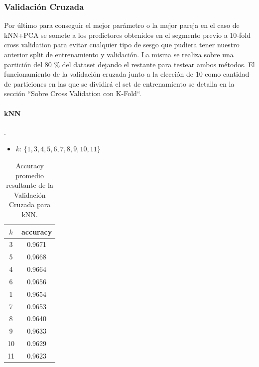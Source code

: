 \subsubsection{Validación Cruzada}

Por último para conseguir el mejor parámetro o la mejor pareja en el caso de kNN+PCA se somete a los predictores obtenidos en el segmento previo a 10-fold cross
validation para evitar cualquier tipo de sesgo que pudiera tener nuestro anterior split de entrenamiento y validación. La misma se realiza sobre una partición del 80 $\%$ del dataset dejando el restante para testear ambos métodos.
El funcionamiento de la validación cruzada junto a la elección de 10 como cantidad de particiones en las que se dividirá el set de entrenamiento se detalla en la sección ``Sobre Cross Validation con K-Fold``.

\paragraph{kNN}.

\begin{itemize}
    \item \textbf{$k$}: $ \{1,3,4,5,6,7,8,9,10,11\}$
\end{itemize}
\begin{table}[h!]
    \begin{center}
        \begin{tabular}{|c|c|}
        \hline
        \textbf{$k$} & \textbf{accuracy} \\
        \hline
        3 &  0.9671\\
        5 & 0.9668\\
        4 & 0.9664\\
        6 & 0.9656\\
        1 &  0.9654\\
        7 & 0.9653\\
        8 & 0.9640\\
        9 & 0.9633\\
        10 & 0.9629\\
        11 & 0.9623\\
        
        \hline
        \end{tabular}
        \caption{Accuracy promedio resultante de la Validación Cruzada para kNN.}
        \label{knn_crossVal_table}
    \end{center}
\end{table}

